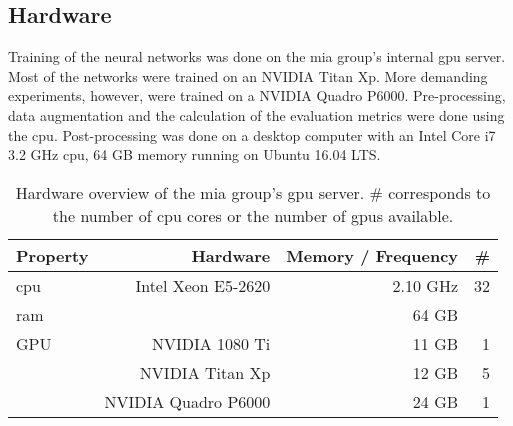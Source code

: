 \subsection{Hardware}
Training of the neural networks was done on the \gls{mia} group's internal \gls{gpu} server. Most of the networks were trained on an NVIDIA Titan Xp. More demanding experiments, however, were trained on a NVIDIA Quadro P6000. Pre-processing, data augmentation and the calculation of the evaluation metrics were done using the \gls{cpu}. Post-processing was done on a desktop computer with an Intel Core i7 3.2 GHz \gls{cpu}, 64 GB memory running on Ubuntu 16.04 LTS.
\begin{table}[htbp]
   \centering
   \caption[Hardware]{Hardware overview of the \gls{mia} group's \gls{gpu} server. \# corresponds to the number of \gls{cpu} cores or the number of \gls{gpu}s available.}
   \begin{tabular}{l*{3}{r}}
      \toprule
      Property & Hardware & Memory / Frequency & \# \\
      \midrule
      \acrshort{cpu} & Intel Xeon E5-2620 & 2.10 GHz & 32 \\
      \acrshort{ram} & & 64 GB & \\
      GPU & NVIDIA 1080 Ti & 11 GB & 1 \\
       & NVIDIA Titan Xp & 12 GB & 5 \\
       & NVIDIA Quadro P6000 & 24 GB & 1 \\
      \bottomrule
   \end{tabular}
   \label{tab:cluster}
\end{table}

